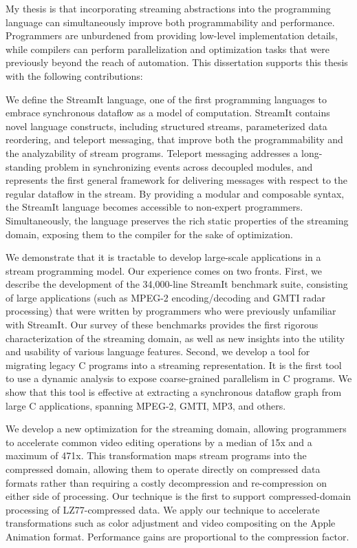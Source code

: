 \label{chap:conclusions}

My thesis is that incorporating streaming abstractions into the
programming language can simultaneously improve both programmability
and performance.  Programmers are unburdened from providing low-level
implementation details, while compilers can perform parallelization
and optimization tasks that were previously beyond the reach of
automation.  This dissertation supports this thesis with the following
contributions:

\mybegin

\item We define the StreamIt language, one of the first programming 
languages to embrace synchronous dataflow as a model of computation.
StreamIt contains novel language constructs, including structured
streams, parameterized data reordering, and teleport messaging, that
improve both the programmability and the analyzability of stream
programs.  Teleport messaging addresses a long-standing problem in
synchronizing events across decoupled modules, and represents the
first general framework for delivering messages with respect to the
regular dataflow in the stream.  By providing a modular and composable
syntax, the StreamIt language becomes accessible to non-expert
programmers.  Simultaneously, the language preserves the rich static
properties of the streaming domain, exposing them to the compiler for
the sake of optimization.

\item We demonstrate that it is tractable to develop large-scale 
applications in a stream programming model.  Our experience comes on
two fronts.  First, we describe the development of the 34,000-line
StreamIt benchmark suite, consisting of large applications (such as
MPEG-2 encoding/decoding and GMTI radar processing) that were written
by programmers who were previously unfamiliar with StreamIt.  Our
survey of these benchmarks provides the first rigorous
characterization of the streaming domain, as well as new insights into
the utility and usability of various language features.  Second, we
develop a tool for migrating legacy C programs into a streaming
representation.  It is the first tool to use a dynamic analysis to
expose coarse-grained parallelism in C programs.  We show that this
tool is effective at extracting a synchronous dataflow graph from
large C applications, spanning MPEG-2, GMTI, MP3, and others.

\item We develop a new optimization for the streaming domain, allowing 
programmers to accelerate common video editing operations by a median
of 15x and a maximum of 471x.  This transformation maps stream
programs into the compressed domain, allowing them to operate directly
on compressed data formats rather than requiring a costly
decompression and re-compression on either side of processing.  Our
technique is the first to support compressed-domain processing of
LZ77-compressed data.  We apply our technique to accelerate
transformations such as color adjustment and video compositing on the
Apple Animation format.  Performance gains are proportional to the
compression factor.

